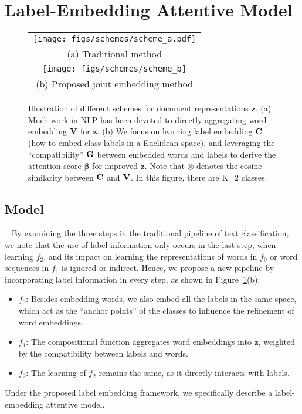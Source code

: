 \documentclass[11pt,a4paper]{article}
\newcommand{\Cmat}{{\bf C}}
\newcommand{\Gmat}{{\bf G}}
\newcommand{\Vmat}[0]{{{\bf V}}}
\newcommand{\zv}{\boldsymbol{z}}
\newcommand{\betav}[0]{{\boldsymbol{\beta}}}
\begin{document}
\section{Label-Embedding Attentive Model}
\begin{figure}[t!] \centering
	\vspace{-0mm}
	\begin{tabular}{c}		
		\texttt{[image: figs/schemes/scheme\_a.pdf]} \\
		(a) Traditional method  \vspace{2mm}  \\
		\texttt{[image: figs/schemes/scheme\_b]}   \\
		(b) Proposed joint embedding method \hspace{-0mm}
	\end{tabular}
	\vspace{-0mm}
	\caption{Illustration of different schemes for document representations $\zv$. 
		(a) Much work in NLP has been devoted to directly aggregating word embedding $\Vmat$ for $\zv$. (b) We focus on learning label embedding $\Cmat$ (how to embed class labels in a Euclidean space), and leveraging the ``compatibility'' $\Gmat$ between embedded words and labels to derive the attention score $\betav$ for improved $\zv$.
		Note that $\otimes$ denotes the cosine similarity between $\Cmat$ and $\Vmat$. In this figure, there are K=2 classes. }
	\vspace{-0mm}
	\label{fig:model_arch}
\end{figure}

\subsection{Model}~\label{sec:model}
By examining the three steps in the traditional pipeline of text classification, we note that the use of label information only occurs in the last step, when learning $f_2$, and its impact on learning the representations of words in $f_0$ or word sequences in $f_1$ is ignored or indirect. Hence, we propose a new pipeline by incorporating label information in every step, as shown in Figure~\ref{fig:model_arch}(b):
\begin{itemize}
	\item $f_0$: Besides embedding words, we also embed all the labels in the same space, which act as the ``anchor points'' of the classes to influence the refinement of word embeddings.
\item $f_1$: The compositional function aggregates word embeddings into $\zv$, weighted by the compatibility between labels and words.
\item $f_2$: The learning of $f_2$ remains the same, as it directly interacts with labels.
\end{itemize}
Under the proposed label embedding framework, we specifically describe a label-embedding attentive model.
\end{document}
